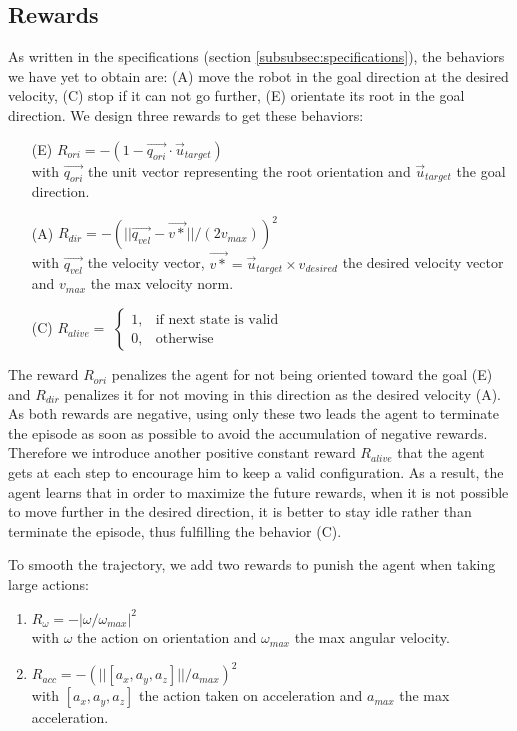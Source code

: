 \subsection{Rewards}
As written in the specifications (section \ref{subsubsec:specifications}), the behaviors we have yet to obtain are: (A) move the robot in the goal direction at the desired velocity, (C) stop if it can not go further, (E) orientate its root in the goal direction. 
We design three rewards to get these behaviors:
\begin{enumerate}
  \item[(E)] $R_{ori} = -( 1 -  \overrightarrow{q_{ori}} \cdot \overrightarrow{u}_{target} )$ \\
  with $\overrightarrow{q_{ori}}$ the unit vector representing the root orientation and $\overrightarrow{u}_{target}$ the goal direction.
  \item[(A)] $R_{dir} = -( ||\overrightarrow{q_{vel}} - \overrightarrow{v*} ||/(2v_{max}) )^2$ \\
  with $\overrightarrow{q_{vel}}$ the velocity vector, $\overrightarrow{v*}=\overrightarrow{u}_{target} \times v_{desired}$ the desired velocity vector and $v_{max}$ the max velocity norm.
  \item[(C)] $R_{alive} = $ 
    $
    \begin{cases}
      1, & \text{if next state is valid} \\
      0, & \text{otherwise}
    \end{cases}
    $
\end{enumerate}
The reward $R_{ori}$ penalizes the agent for not being oriented toward the goal (E) and $R_{dir}$ penalizes it for not moving in this direction as the desired velocity (A). 
As both rewards are negative, using only these two leads the agent to terminate the episode as soon as possible to avoid the accumulation of negative rewards. 
Therefore we introduce another positive constant reward $R_{alive}$ that the agent gets at each step to encourage him to keep a valid configuration. 
As a result, the agent learns that in order to maximize the future rewards, when it is not possible to move further in the desired direction, it is better to stay idle rather than terminate the episode, thus fulfilling the behavior (C).

To smooth the trajectory, we add two rewards to punish the agent when taking large actions:
\begin{enumerate}
    \item $R_{\omega} = - | \omega / \omega_{max} |^2 $ \\
    with $\omega$ the action on orientation and $\omega_{max}$ the max angular velocity.
    \item $R_{acc} = - (|| [a_{x},a_{y},a_{z}] || / a_{max})^2 $ \\
    with $[a_{x},a_{y},a_{z}]$ the action taken on acceleration and $a_{max}$ the max acceleration.
\end{enumerate}

